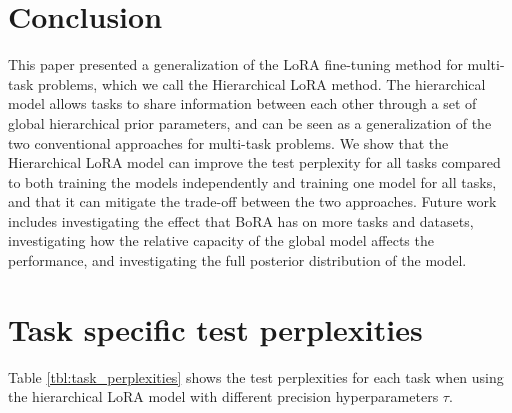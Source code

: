 \documentclass{article}
\begin{document}
\section{Conclusion}
This paper presented a generalization of the LoRA fine-tuning method for multi-task problems, which we call the Hierarchical LoRA method. The hierarchical model allows tasks to share information between each other through a set of global hierarchical prior parameters, and can be seen as a generalization of the two conventional approaches for multi-task problems. We show that the Hierarchical LoRA model can improve the test perplexity for all tasks compared to both training the models independently and training one model for all tasks, and that it can mitigate the trade-off between the two approaches.
Future work includes investigating the effect that BoRA has on more tasks and datasets, investigating how the relative capacity of the global model affects the performance, and investigating the full posterior distribution of the model.

\printbibliography

\appendix
\section{Task specific test perplexities}
Table \ref{tbl:task_perplexities} shows the test perplexities for each task when using the hierarchical LoRA model with different precision hyperparameters $\tau$.
\end{document}
